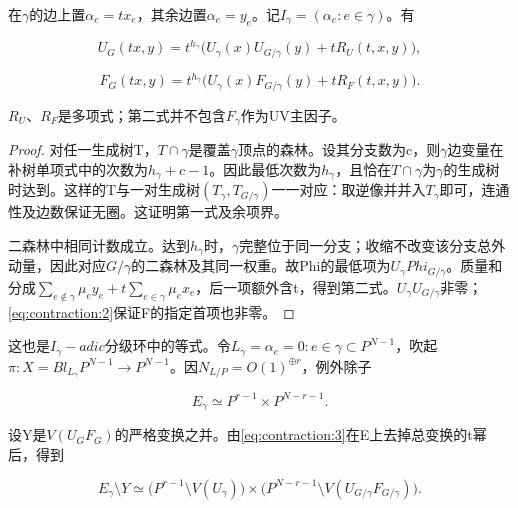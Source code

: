 \documentclass[11pt,a4paper,oneside]{ctexart}
\theoremstyle{cnplain}
\theoremstyle{definition}
\theoremstyle{remark}
\numberwithin{equation}{section}
\begin{document}
在\(\gamma \)的边上置\(\alpha _e=t x_e\)，其余边置\(\alpha _e=y_e\)。记\(I_\gamma =(\alpha _e:e\in \gamma )\)。有

\begin{equation}
U_G(tx,y)=t^{h_\gamma}\big(U_\gamma(x)U_{G/\gamma}(y)+tR_U(t,x,y)\big),
\end{equation}

\begin{equation}
F_G(tx,y)=t^{h_\gamma}\big(U_\gamma(x)F_{G/\gamma}(y)+tR_F(t,x,y)\big).       \label{eq:contraction:3}
\end{equation}

\(R_U\)、\(R_F\)是多项式；第二式并不包含\(F_\gamma \)作为UV主因子。

\begin{proof}

对任一生成树T，\(T\cap \gamma \)是覆盖\(\gamma \)顶点的森林。设其分支数为c，则\(\gamma \)边变量在补树单项式中的次数为\(h_\gamma +c- 1\)。因此最低次数为\(h_\gamma \)，且恰在\(T\cap \gamma \)为\(\gamma \)的生成树时达到。这样的T与一对生成树\((T_\gamma ,T_{G/\gamma })\)一一对应：取逆像并并入\(T_\gamma \)即可，连通性及边数保证无圈。这证明第一式及余项界。

二森林中相同计数成立。达到\(h_\gamma \)时，\(\gamma \)完整位于同一分支；收缩不改变该分支总外动量，因此对应\(G/\gamma \)的二森林及其同一权重。故Phi的最低项为\(U_\gamma  Phi_{G/\gamma }\)。质量和分成\(\sum _{e\notin \gamma }\mu _e y_e+t\sum _{e\in \gamma }\mu _e x_e\)，后一项额外含t，得到第二式。\(U_\gamma  U_{G/\gamma }\)非零；\eqref{eq:contraction:2}保证F的指定首项也非零。

\end{proof}

这也是\(I_\gamma -adic\)分级环中的等式。令\(L_\gamma ={\alpha _e=0:e\in \gamma }\subset P^{N- 1}\)，吹起\(\pi :X=Bl_{L_\gamma }P^{N- 1}\to P^{N- 1}\)。因\(N_{L/P}=O(1)^{\oplus r}\)，例外除子

\begin{equation}
E_\gamma\simeq P^{r-1}\times P^{N-r-1}.          \label{eq:contraction:4}
\end{equation}

设Y是\(V(U_G F_G)\)的严格变换之并。由\eqref{eq:contraction:3}在E上去掉总变换的t幂后，得到

\begin{equation}
E_\gamma\setminus Y
  \simeq\big(P^{r-1}\setminus V(U_\gamma)\big)
       \times\big(P^{N-r-1}\setminus V(U_{G/\gamma}F_{G/\gamma})\big).
                                                                    \label{eq:contraction:5}
\end{equation}
\end{document}

